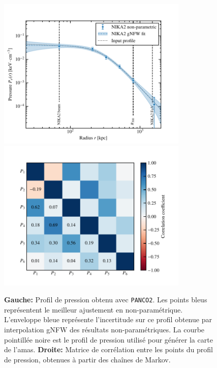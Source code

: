 \begin{figure}[t]
    \centering
    \includegraphics[height=7.25cm, trim={0cm 0cm 1cm 0cm}, clip]{Figures/Chap_panco/demo_plots/pressure.pdf}
    \includegraphics[height=7.25cm, trim={1cm 0cm 0cm 0cm}, clip]{Figures/Chap_panco/demo_plots/pressure_correlations.pdf}
    \caption{
        \textbf{Gauche:} Profil de pression obtenu avec \texttt{PANCO2}.
        Les points bleus représentent le meilleur ajustement en non-paramétrique.
        L'enveloppe bleue représente l'incertitude sur ce profil obtenue par interpolation gNFW des résultats non-paramétriques.
        La courbe pointillée noire est le profil de pression utilisé pour générer la carte de l'amas.
        \textbf{Droite:} Matrice de corrélation entre les points du profil de pression, obtenues à partir des chaînes de Markov.
    }
    \label{fig:panco2:actlike_press}
\end{figure}

